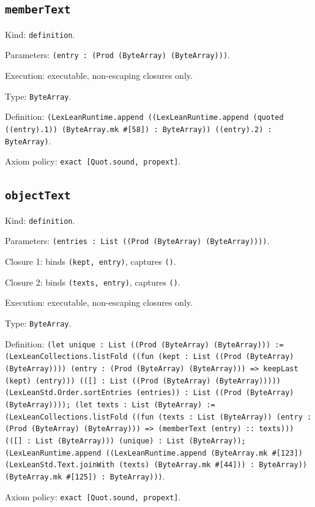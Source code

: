 \documentclass[11pt]{article}
\begin{document}
\subsection*{\texttt{memberText}}
\noindent Kind: \texttt{definition}.\par
\noindent Parameters: \texttt{(entry : (Prod (ByteArray) (ByteArray)))}.\par
\noindent Execution: executable, non-escaping closures only.\par
\noindent Type: \texttt{ByteArray}.\par
\noindent Definition: \texttt{(LexLeanRuntime.append ((LexLeanRuntime.append (quoted ((entry).1)) (ByteArray.mk \#[58]) : ByteArray)) ((entry).2) : ByteArray)}.\par
\noindent Axiom policy: \texttt{exact [Quot.sound, propext]}.\par
\subsection*{\texttt{objectText}}
\noindent Kind: \texttt{definition}.\par
\noindent Parameters: \texttt{(entries : List ((Prod (ByteArray) (ByteArray))))}.\par
\noindent Closure 1: binds \texttt{(kept, entry)}, captures \texttt{()}.\par
\noindent Closure 2: binds \texttt{(texts, entry)}, captures \texttt{()}.\par
\noindent Execution: executable, non-escaping closures only.\par
\noindent Type: \texttt{ByteArray}.\par
\noindent Definition: \texttt{(let unique : List ((Prod (ByteArray) (ByteArray))) := (LexLeanCollections.listFold ((fun (kept : List ((Prod (ByteArray) (ByteArray)))) (entry : (Prod (ByteArray) (ByteArray))) => keepLast (kept) (entry))) (([] : List ((Prod (ByteArray) (ByteArray))))) (LexLeanStd.Order.sortEntries (entries)) : List ((Prod (ByteArray) (ByteArray)))); (let texts : List (ByteArray) := (LexLeanCollections.listFold ((fun (texts : List (ByteArray)) (entry : (Prod (ByteArray) (ByteArray))) => (memberText (entry) :: texts))) (([] : List (ByteArray))) (unique) : List (ByteArray)); (LexLeanRuntime.append ((LexLeanRuntime.append (ByteArray.mk \#[123]) (LexLeanStd.Text.joinWith (texts) (ByteArray.mk \#[44])) : ByteArray)) (ByteArray.mk \#[125]) : ByteArray)))}.\par
\noindent Axiom policy: \texttt{exact [Quot.sound, propext]}.\par
\end{document}
